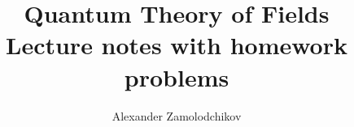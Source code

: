 \documentclass[11pt,a4paper]{article}
\title{Quantum Theory of Fields\\[4pt]\large Lecture notes with homework problems}
\author{Alexander Zamolodchikov}
\numberwithin{equation}{section}
\theoremstyle{definition}
\begin{document}
\maketitle
\flushbottom


\end{document}

